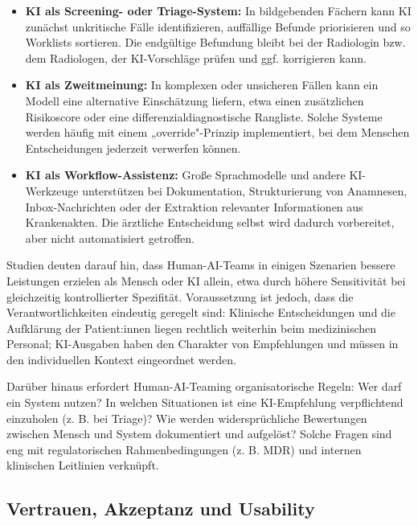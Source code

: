 \documentclass[lettersize,journal]{IEEEtran}
\begin{document}
	\begin{itemize}
		\item \textbf{KI als Screening- oder Triage-System:} In bildgebenden Fächern kann KI zunächst unkritische Fälle identifizieren, auffällige Befunde priorisieren und so Worklists sortieren. Die endgültige Befundung bleibt bei der Radiologin bzw. dem Radiologen, der KI-Vorschläge prüfen und ggf. korrigieren kann\cite{ref:hai2025aiindex}.
		\item \textbf{KI als Zweitmeinung:} In komplexen oder unsicheren Fällen kann ein Modell eine alternative Einschätzung liefern, etwa einen zusätzlichen Risikoscore oder eine differenzialdiagnostische Rangliste. Solche Systeme werden häufig mit einem „override"-Prinzip implementiert, bei dem Menschen Entscheidungen jederzeit verwerfen können\cite{ref:faiyazuddin2025}.
		\item \textbf{KI als Workflow-Assistenz:} Große Sprachmodelle und andere KI-Werkzeuge unterstützen bei Dokumentation, Strukturierung von Anamnesen, Inbox-Nachrichten oder der Extraktion relevanter Informationen aus Krankenakten\cite{ref:Artsi.2025}. Die ärztliche Entscheidung selbst wird dadurch vorbereitet, aber nicht automatisiert getroffen.
	\end{itemize}
	
	Studien deuten darauf hin, dass Human-AI-Teams in einigen Szenarien bessere Leistungen erzielen als Mensch oder KI allein, etwa durch höhere Sensitivität bei gleichzeitig kontrollierter Spezifität\cite{ref:hai2025aiindex}\cite{ref:faiyazuddin2025}. Voraussetzung ist jedoch, dass die Verantwortlichkeiten eindeutig geregelt sind: Klinische Entscheidungen und die Aufklärung der Patient:innen liegen rechtlich weiterhin beim medizinischen Personal; KI-Ausgaben haben den Charakter von Empfehlungen und müssen in den individuellen Kontext eingeordnet werden.
	
	Darüber hinaus erfordert Human-AI-Teaming organisatorische Regeln: Wer darf ein System nutzen? In welchen Situationen ist eine KI-Empfehlung verpflichtend einzuholen (z. B. bei Triage)? Wie werden widersprüchliche Bewertungen zwischen Mensch und System dokumentiert und aufgelöst? Solche Fragen sind eng mit regulatorischen Rahmenbedingungen (z. B. MDR) und internen klinischen Leitlinien verknüpft.
	
	\subsection{Vertrauen, Akzeptanz und Usability}
\end{document}
